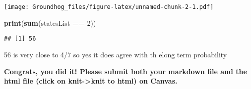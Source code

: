 \documentclass[
]{article}
\newenvironment{Shaded}{\begin{snugshade}}{\end{snugshade}}
\newcommand{\DecValTok}[1]{\textcolor[rgb]{0.00,0.00,0.81}{#1}}
\newcommand{\FunctionTok}[1]{\textcolor[rgb]{0.13,0.29,0.53}{\textbf{#1}}}
\newcommand{\NormalTok}[1]{#1}
\newcommand{\SpecialCharTok}[1]{\textcolor[rgb]{0.81,0.36,0.00}{\textbf{#1}}}
\begin{document}
\texttt{[image: Groundhog\_files/figure-latex/unnamed-chunk-2-1.pdf]}

\begin{Shaded}
\begin{Highlighting}[]
\FunctionTok{print}\NormalTok{(}\FunctionTok{sum}\NormalTok{(statesList }\SpecialCharTok{==} \DecValTok{2}\NormalTok{))}
\end{Highlighting}
\end{Shaded}

\begin{verbatim}
## [1] 56
\end{verbatim}

56 is very close to 4/7 so yes it does agree with th elong term
probability

\textbf{Congrats, you did it! Please submit both your markdown file and
the html file (click on knit-\textgreater knit to html) on Canvas.}
\end{document}

